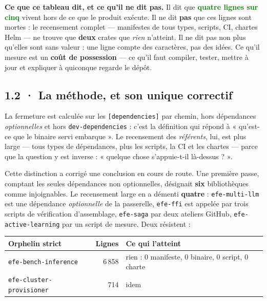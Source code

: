 \documentclass[10pt]{article}
\newcommand{\best}[1]{\textcolor{green}{\textbf{#1}}}
\newcommand{\code}[1]{\texttt{\small #1}}
\begin{document}
\begin{these}
\textbf{Ce que ce tableau dit, et ce qu'il ne dit pas.} Il dit que \best{quatre lignes sur cinq}
vivent hors de ce que le produit exécute. Il ne dit \textbf{pas} que ces lignes sont mortes : le
recensement complet --- manifestes de tous types, scripts, CI, chartes Helm --- ne trouve que
\textbf{deux} crates que \emph{rien} n'atteint. Il ne dit pas non plus qu'elles sont sans valeur :
une ligne compte des caractères, pas des idées. Ce qu'il mesure est un \textbf{coût de possession}
--- ce qu'il faut compiler, tester, mettre à jour et expliquer à quiconque regarde le dépôt.
\end{these}

\subsection{1.2 · La méthode, et son unique correctif}

La fermeture est calculée sur les \code{[dependencies]} par chemin, hors dépendances
\emph{optionnelles} et hors \code{dev-dependencies} : c'est la définition qui répond à « qu'est-ce
que le binaire servi embarque ». Le recensement des \emph{référents}, lui, est plus large ---
tous types de dépendances, plus les scripts, la CI et les chartes --- parce que la question y est
inverse : « quelque chose s'appuie-t-il là-dessus ? ».

Cette distinction a corrigé une conclusion en cours de route. Une première passe, comptant les
seules dépendances non optionnelles, désignait \textbf{six} bibliothèques comme injoignables. Le
recensement large en a démenti \textbf{quatre} : \code{efe-multi-llm} est une dépendance
\emph{optionnelle} de la passerelle, \code{efe-ffi} est appelée par trois scripts de vérification
d'assemblage, \code{efe-saga} par deux ateliers GitHub, \code{efe-active-learning} par un script de
mesure. Deux résistent :

\begin{center}\small
\begin{tabular}{@{}>{\raggedright\arraybackslash}p{5.4cm} r >{\raggedright\arraybackslash}p{7.6cm}@{}}
\toprule
\textbf{Orphelin strict} & \textbf{Lignes} & \textbf{Ce qui l'atteint} \\
\midrule
\code{efe-bench-inference} & 6\,858 & rien : 0 manifeste, 0 binaire, 0 script, 0 charte \\
\code{efe-cluster-provisioner} & 714 & idem \\
\bottomrule
\end{tabular}
\end{center}
\end{document}
